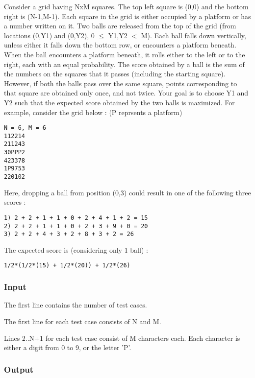 



   Consider a grid having NxM squares. The top left square is (0,0) and the bottom right is (N-1,M-1). Each square in the grid is either occupied by a platform or has a number written on it. Two balls are released from the top of the grid (from locations (0,Y1) and (0,Y2), 0  $\le$  Y1,Y2 $<$ M). Each ball falls down vertically, unless either it falls down the bottom row, or encounters a platform beneath. When the ball encounters a platform beneath, it rolls either to the left or to the right, each with an equal probability. The score obtained by a ball is the sum of the numbers on the squares that it passes (including the starting square). However, if both the balls pass over the same square, points corresponding to that square are obtained only once, and not twice. Your goal is to choose Y1 and Y2 such that the expected score obtained by the two balls is maximized. For example, consider the grid below : (P reprsents a platform)  
\begin{verbatim}
N = 6, M = 6
112214
211243
30PPP2
423378
1P9753
220102
\end{verbatim}

   Here, dropping a ball from position (0,3) could result in one of the following three scores :  
\begin{verbatim}
1) 2 + 2 + 1 + 1 + 0 + 2 + 4 + 1 + 2 = 15 
2) 2 + 2 + 1 + 1 + 0 + 2 + 3 + 9 + 0 = 20
3) 2 + 2 + 4 + 3 + 2 + 8 + 3 + 2 = 26
\end{verbatim}

   The expected score is (considering only 1 ball) :  
\begin{verbatim}
1/2*(1/2*(15) + 1/2*(20)) + 1/2*(26)\end{verbatim}

\subsubsection{   Input  }

   The first line contains the number of test cases.  

   The first line for each test case consists of N and M.  

   Lines 2..N+1 for each test case consist of M characters each. Each character is either a digit from 0 to 9, or the letter 'P'.  

\subsubsection{   Output  }

